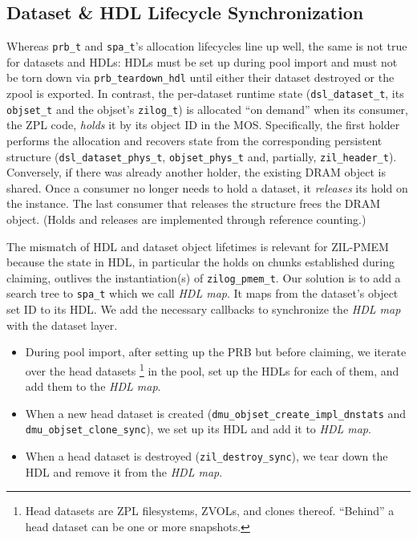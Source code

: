\documentclass[12pt,a4paper,twoside]{book}
\begin{document}
\subsection{Dataset \& HDL Lifecycle Synchronization}\label{sec:zilpmem:hdllifecycle}
Whereas \lstinline{prb_t} and \lstinline{spa_t}'s allocation lifecycles line up well, the same is not true for datasets and HDLs:
HDLs must be set up during pool import and must not be torn down via \lstinline{prb_teardown_hdl} until either their dataset destroyed or the zpool is exported.
In contrast, the per-dataset runtime state (\lstinline{dsl_dataset_t}, its \lstinline{objset_t} and the objset's \lstinline{zilog_t}) is allocated ``on demand'' when its consumer, the ZPL code, \textit{holds} it by its object ID in the MOS.
Specifically, the first holder performs the allocation and recovers state from the corresponding persistent structure (\lstinline{dsl_dataset_phys_t}, \lstinline{objset_phys_t} and, partially, \lstinline{zil_header_t}).
Conversely, if there was already another holder, the existing DRAM object is shared.
Once a consumer no longer needs to hold a dataset, it \textit{releases} its hold on the instance.
The last consumer that releases the structure frees the DRAM object.
(Holds and releases are implemented through reference counting.)

The mismatch of HDL and dataset object lifetimes is relevant for ZIL-PMEM because the state in HDL, in particular the holds on chunks established during claiming, outlives the instantiation(s) of \lstinline{zilog_pmem_t}.
Our solution is to add a search tree to \lstinline{spa_t} which we call \textit{HDL map}.
It maps from the dataset's object set ID to its HDL.
We add the necessary callbacks to synchronize the \textit{HDL map} with the dataset layer.
\begin{itemize}[noitemsep]
    \item During pool import, after setting up the PRB but before claiming, we iterate over the head datasets%
        \footnote{Head datasets are ZPL filesystems, ZVOLs, and clones thereof. ``Behind'' a head dataset can be one or more snapshots.}
        in the pool, set up the HDLs for each of them, and add them to the \textit{HDL map}.
    \item When a new head dataset is created (\lstinline{dmu_objset_create_impl_dnstats} and \lstinline{dmu_objset_clone_sync}), we set up its HDL and add it to \textit{HDL map}.
    \item When a head dataset is destroyed (\lstinline{zil_destroy_sync}), we tear down the HDL and remove it from the \textit{HDL map}.
\end{itemize}
\end{document}
